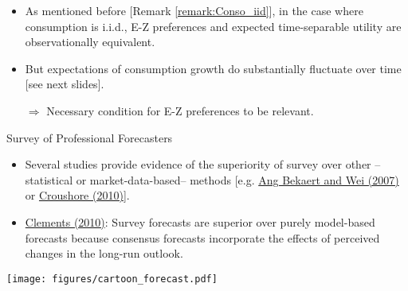 \begin{frame}{}
\begin{footnotesize}
\begin{itemize}
	\item As mentioned before [Remark \ref{remark:Conso_iid}], in the case where consumption is i.i.d., E-Z preferences and expected time-separable utility are observationally equivalent.
	
	\item But expectations of consumption growth do substantially fluctuate over time [see next slides].
	
	$\Rightarrow$ Necessary condition for E-Z preferences to be relevant.
	
\end{itemize}

\begin{exampleblock}{Survey of Professional Forecasters}
	\begin{itemize}
		\item Several studies provide evidence of the superiority of survey over other --statistical or market-data-based-- methods [e.g. \href{http://www.sciencedirect.com/science/article/pii/S0304393206002303}{Ang Bekaert and Wei (2007)} or \href{https://ideas.repec.org/a/bpj/bejmac/v10y2010i1n10.html}{Croushore (2010)}].
		\item \href{https://www2.warwick.ac.uk/fac/soc/economics/research/workingpapers/2010/twerp_954.pdf}{Clements (2010)}: Survey forecasts are superior over purely model-based forecasts because consensus forecasts incorporate the effects of perceived changes in the long-run outlook.
	\end{itemize}
\end{exampleblock}

\end{footnotesize}
\end{frame}


\begin{frame}
\begin{center}
		\texttt{[image: figures/cartoon\_forecast.pdf]}
\end{center}
\end{frame}

